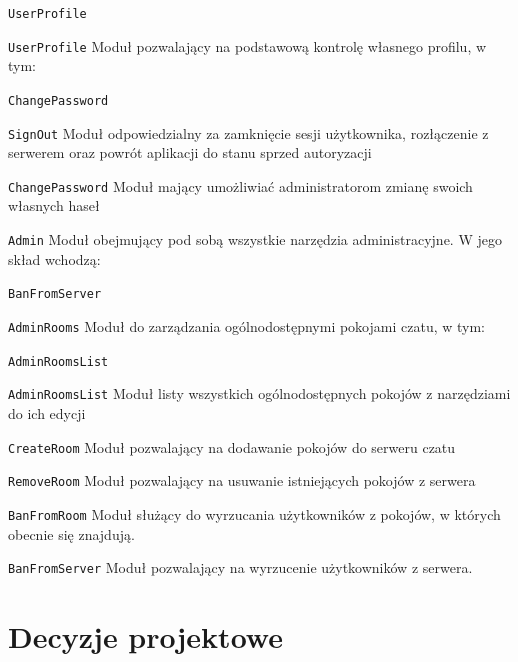 \begin{labeling}{\texttt{UserProfile}}
\item[\texttt{UserProfile}] Moduł pozwalający na podstawową kontrolę
własnego profilu, w tym:

\begin{labeling}{\texttt{ChangePassword}}
	\item[\texttt{SignOut}] Moduł odpowiedzialny za zamknięcie sesji
	użytkownika, rozłączenie z serwerem oraz powrót aplikacji do
	stanu sprzed autoryzacji

	\item[\texttt{ChangePassword}] Moduł mający umożliwiać administratorom
	zmianę swoich własnych haseł

\end{labeling}

\item[\texttt{Admin}] Moduł obejmujący pod sobą wszystkie narzędzia
administracyjne. W jego skład wchodzą:

\begin{labeling}{\texttt{BanFromServer}}
	\item[\texttt{AdminRooms}] Moduł do zarządzania ogólnodostępnymi
	pokojami czatu, w tym:

	\begin{labeling}{\texttt{AdminRoomsList}}
		\item[\texttt{AdminRoomsList}] Moduł listy wszystkich ogólnodostępnych
		pokojów z narzędziami do ich edycji

		\item[\texttt{CreateRoom}] Moduł pozwalający na dodawanie pokojów
		do serweru czatu

		\item[\texttt{RemoveRoom}] Moduł pozwalający na usuwanie istniejących
		pokojów z serwera
	\end{labeling}

	\item[\texttt{BanFromRoom}] Moduł służący do wyrzucania użytkowników
	z pokojów, w których obecnie się znajdują.

	\item[\texttt{BanFromServer}] Moduł pozwalający na wyrzucenie
	użytkowników z serwera.
\end{labeling}

\end{labeling}
\section{Decyzje projektowe}

